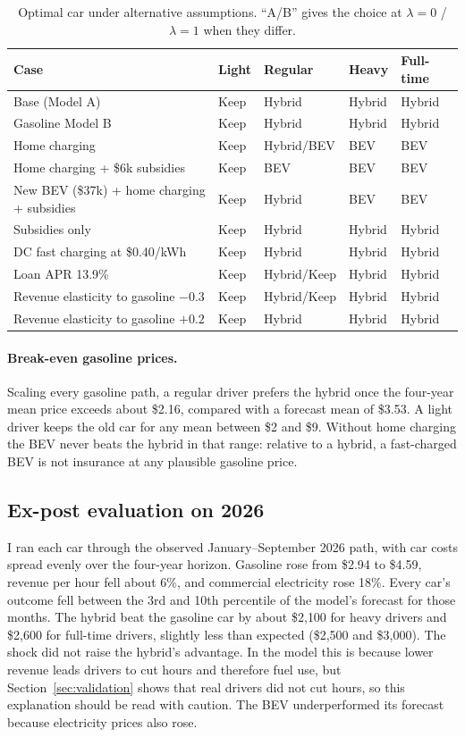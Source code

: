 \documentclass[11pt]{article}
\begin{document}
\begin{table}[ht]
\centering
\caption{Optimal car under alternative assumptions. ``A/B'' gives the choice at $\lambda=0$ / $\lambda=1$ when they differ.}\label{tab:sens}
\small
\begin{tabular}{@{}lllll@{}}
\toprule
Case & Light & Regular & Heavy & Full-time \\
\midrule
Base (Model A) & Keep & Hybrid & Hybrid & Hybrid \\
Gasoline Model B & Keep & Hybrid & Hybrid & Hybrid \\
Home charging & Keep & Hybrid/BEV & BEV & BEV \\
Home charging + \$6k subsidies & Keep & BEV & BEV & BEV \\
New BEV (\$37k) + home charging + subsidies & Keep & Hybrid & BEV & BEV \\
Subsidies only & Keep & Hybrid & Hybrid & Hybrid \\
DC fast charging at \$0.40/kWh & Keep & Hybrid & Hybrid & Hybrid \\
Loan APR 13.9\% & Keep & Hybrid/Keep & Hybrid & Hybrid \\
Revenue elasticity to gasoline $-0.3$ & Keep & Hybrid/Keep & Hybrid & Hybrid \\
Revenue elasticity to gasoline $+0.2$ & Keep & Hybrid & Hybrid & Hybrid \\
\bottomrule
\end{tabular}
\end{table}

\paragraph{Break-even gasoline prices.} Scaling every gasoline path, a regular driver prefers the hybrid once the four-year mean price exceeds about \$2.16, compared with a forecast mean of \$3.53. A light driver keeps the old car for any mean between \$2 and \$9. Without home charging the BEV never beats the hybrid in that range: relative to a hybrid, a fast-charged BEV is not insurance at any plausible gasoline price.

\subsection{Ex-post evaluation on 2026}

I ran each car through the observed January--September 2026 path, with car costs spread evenly over the four-year horizon. Gasoline rose from \$2.94 to \$4.59, revenue per hour fell about 6\%, and commercial electricity rose 18\%. Every car's outcome fell between the 3rd and 10th percentile of the model's forecast for those months. The hybrid beat the gasoline car by about \$2{,}100 for heavy drivers and \$2{,}600 for full-time drivers, slightly less than expected (\$2{,}500 and \$3{,}000). The shock did not raise the hybrid's advantage. In the model this is because lower revenue leads drivers to cut hours and therefore fuel use, but Section~\ref{sec:validation} shows that real drivers did not cut hours, so this explanation should be read with caution. The BEV underperformed its forecast because electricity prices also rose.
\end{document}
